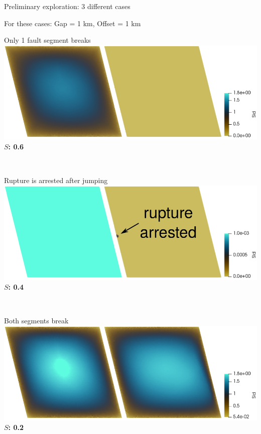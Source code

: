 \documentclass{beamer}
\begin{document}
\begin{frame}
 {Preliminary exploration: 3 different cases}

 \begin{center}
 For these cases: Gap = 1 km, Offset = 1 km \\
 \vskip 0.4cm
 \begin{minipage}{0.48\linewidth}
 \centering \small Only 1 fault segment breaks \\
  	\includegraphics[width=\textwidth]{images/nojump/nojump_neg_0004.png}   
    {\bf $S$: 0.6}
 \end{minipage} \,
 \begin{minipage}{0.48\linewidth}
    \centering \small Rupture is arrested after jumping \\
  	\includegraphics[width=\textwidth]{images/arrested/arrested_neg_0010.png}   
  	{\bf $S$: 0.4}
 \end{minipage} \\
 \vskip 0.5cm
 \begin{minipage}{0.45\linewidth}
    \centering \small Both segments break \\
  	\includegraphics[width=\textwidth]{images/jumping/jumping_neg_0004.png}   
  	{\bf $S$: 0.2}
 \end{minipage}
 \end{center}
 \addtocounter{framenumber}{-1}
  
\end{frame}
\end{document}
